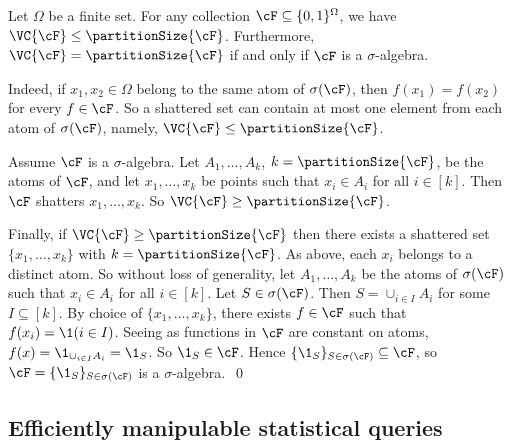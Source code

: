 \begin{remark}
	Let $\Omega$ be a finite set. For any collection $\cF \subseteq \{0,1\}^\Omega$, we have $\VC{\cF} \leq \partitionSize{\cF}$. Furthermore, $\VC{\cF} = \partitionSize{\cF}$ if and only if $\cF$ is a $\sigma$-algebra. 
	
	Indeed, if $x_1,x_2 \in \Omega$ belong to the same atom of $\sigma(\cF)$, then $f(x_1) = f(x_2)$ for every $f \in \cF$. So a shattered set can contain at most one element from each atom of $\sigma(\cF)$, namely, $\VC{\cF} \leq \partitionSize{\cF}$. 
	
	Assume $\cF$ is a $\sigma$-algebra. Let $A_1,\dots,A_k$, $k = \partitionSize{\cF}$, be the atoms of $\cF$, and let $x_1,\dots,x_k$ be points such that $x_i \in A_i$ for all $i \in [k]$. Then $\cF$ shatters $x_1,\dots,x_k$. So $\VC{\cF} \geq \partitionSize{\cF}$. 
	
	Finally, if $\VC{\cF} \geq \partitionSize{\cF}$ then there exists a shattered set $\{x_1,\dots,x_k\}$ with $k = \partitionSize{\cF}$. As above, each $x_i$ belongs to a distinct atom. So without loss of generality, let $A_1,\dots,A_k$ be the atoms of $\sigma(\cF)$ such that $x_i \in A_i$ for all $i \in [k]$. Let $S \in \sigma(\cF)$. Then $S = \cup_{i \in I}A_i$ for some $I \subseteq [k]$. By choice of $\{x_1,\dots,x_k\}$, there exists $f \in \cF$ such that $f(x_i) = \1(i \in I)$. Seeing as functions in $\cF$ are constant on atoms, $f(x) = \1_{\cup_{i \in I}A_i} = \1_S$. So $\1_S \in \cF$. Hence $\{\1_S\}_{S \in \sigma(\cF)} \subseteq \cF$, so $\cF = \{\1_S\}_{S \in \sigma(\cF)}$ is a $\sigma$-algebra.~\qed
\end{remark}

\subsection{Efficiently manipulable statistical queries}


